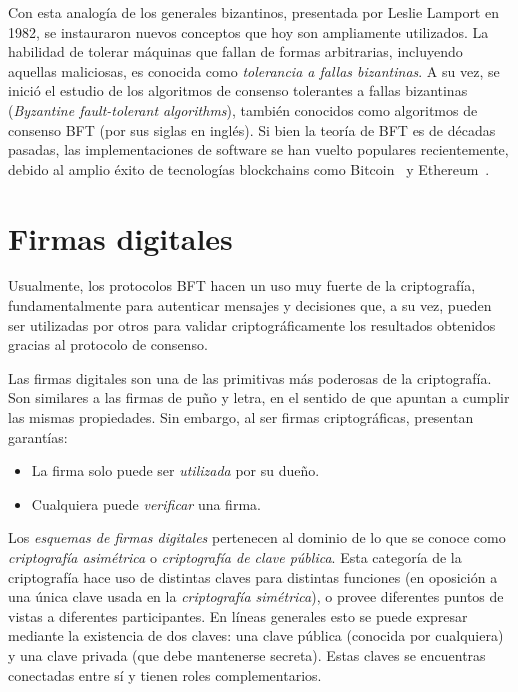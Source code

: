 Con esta analogía de los generales bizantinos, presentada por Leslie Lamport en 1982,
se instauraron nuevos conceptos que hoy son ampliamente utilizados.
La habilidad de tolerar máquinas que fallan de formas arbitrarias, incluyendo aquellas maliciosas,
es conocida como \emph{tolerancia a fallas bizantinas}.
A su vez, se inició el estudio de los algoritmos de consenso tolerantes a fallas
bizantinas (\textit{Byzantine fault-tolerant algorithms}), también conocidos como algoritmos de consenso BFT (por sus siglas en inglés).
Si bien la teoría de
BFT es de décadas pasadas, las implementaciones de software se han vuelto populares recientemente,
debido al amplio éxito de tecnologías blockchains como Bitcoin~\cite{nakamoto06bitcoin} y Ethereum~\cite{wood2014ethereum}.

\section{Firmas digitales}\label{subsec:signatures}
Usualmente, los protocolos BFT hacen un uso muy fuerte de la criptografía, fundamentalmente para autenticar
mensajes y decisiones que, a su vez, pueden ser utilizadas por otros para validar criptográficamente los resultados
obtenidos gracias al protocolo de consenso.

%
Las firmas digitales son una de las primitivas más poderosas de la criptografía.
Son similares a las firmas de puño y letra, en el sentido de que apuntan a cumplir las mismas propiedades.
Sin embargo, al ser firmas criptográficas, presentan garantías:
\begin{itemize}
  \item La firma solo puede ser \textit{utilizada} por su dueño.
  \item Cualquiera puede \textit{verificar} una firma.
\end{itemize}
 
Los \textit{esquemas de firmas digitales} pertenecen al dominio de lo que se conoce como \textit{criptografía asimétrica}
o \textit{criptografía de clave pública}.
%
Esta categoría de la criptografía hace uso de distintas claves para distintas funciones (en oposición a una única
clave usada en la \textit{criptografía simétrica}), o provee diferentes puntos de vistas a diferentes participantes.
%
En líneas generales esto se puede expresar mediante la existencia de dos claves: una clave pública (conocida por cualquiera)
y una clave privada (que debe mantenerse secreta). Estas claves se encuentras conectadas entre sí y tienen roles complementarios.


